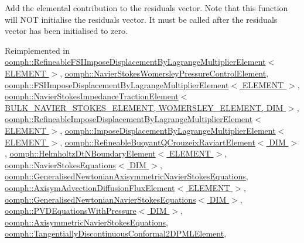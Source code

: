 Add the elemental contribution to the residuals vector. Note that this function will N\+OT initialise the residuals vector. It must be called after the residuals vector has been initialised to zero. 



Reimplemented in \hyperlink{classoomph_1_1RefineableFSIImposeDisplacementByLagrangeMultiplierElement_aa4b78afa54ddb638bfc9428b2b6fe860}{oomph\+::\+Refineable\+F\+S\+I\+Impose\+Displacement\+By\+Lagrange\+Multiplier\+Element$<$ E\+L\+E\+M\+E\+N\+T $>$}, \hyperlink{classoomph_1_1NavierStokesWomersleyPressureControlElement_a336e39637cd1405c5edefbcb4c9e26e8}{oomph\+::\+Navier\+Stokes\+Womersley\+Pressure\+Control\+Element}, \hyperlink{classoomph_1_1FSIImposeDisplacementByLagrangeMultiplierElement_aadea4a492cc464dae2c77617a706a98d}{oomph\+::\+F\+S\+I\+Impose\+Displacement\+By\+Lagrange\+Multiplier\+Element$<$ E\+L\+E\+M\+E\+N\+T $>$}, \hyperlink{classoomph_1_1NavierStokesImpedanceTractionElement_a59864479b537aae999dceaa38e8856ef}{oomph\+::\+Navier\+Stokes\+Impedance\+Traction\+Element$<$ B\+U\+L\+K\+\_\+\+N\+A\+V\+I\+E\+R\+\_\+\+S\+T\+O\+K\+E\+S\+\_\+\+E\+L\+E\+M\+E\+N\+T, W\+O\+M\+E\+R\+S\+L\+E\+Y\+\_\+\+E\+L\+E\+M\+E\+N\+T, D\+I\+M $>$}, \hyperlink{classoomph_1_1RefineableImposeDisplacementByLagrangeMultiplierElement_a31ed3e9bd0d168fb2278add70062dac2}{oomph\+::\+Refineable\+Impose\+Displacement\+By\+Lagrange\+Multiplier\+Element$<$ E\+L\+E\+M\+E\+N\+T $>$}, \hyperlink{classoomph_1_1ImposeDisplacementByLagrangeMultiplierElement_a1c65bc4013288cba24313e4cd1339919}{oomph\+::\+Impose\+Displacement\+By\+Lagrange\+Multiplier\+Element$<$ E\+L\+E\+M\+E\+N\+T $>$}, \hyperlink{classoomph_1_1RefineableBuoyantQCrouzeixRaviartElement_a102b3aeb79d9af430b9ce0a7c8d5bd33}{oomph\+::\+Refineable\+Buoyant\+Q\+Crouzeix\+Raviart\+Element$<$ D\+I\+M $>$}, \hyperlink{classoomph_1_1HelmholtzDtNBoundaryElement_a963011242bb33d0e5d8cbd46dd878f9e}{oomph\+::\+Helmholtz\+Dt\+N\+Boundary\+Element$<$ E\+L\+E\+M\+E\+N\+T $>$}, \hyperlink{classoomph_1_1NavierStokesEquations_a314875a11bafbf24d6a84df31e0213e8}{oomph\+::\+Navier\+Stokes\+Equations$<$ D\+I\+M $>$}, \hyperlink{classoomph_1_1GeneralisedNewtonianAxisymmetricNavierStokesEquations_a93e6106a94fe78998c9e9eb63d8825bc}{oomph\+::\+Generalised\+Newtonian\+Axisymmetric\+Navier\+Stokes\+Equations}, \hyperlink{classoomph_1_1AxisymAdvectionDiffusionFluxElement_a2264f12223ccbcc2f4e3f89403fddea4}{oomph\+::\+Axisym\+Advection\+Diffusion\+Flux\+Element$<$ E\+L\+E\+M\+E\+N\+T $>$}, \hyperlink{classoomph_1_1GeneralisedNewtonianNavierStokesEquations_a6caf76fe70722b03b4826aa4b1dd6612}{oomph\+::\+Generalised\+Newtonian\+Navier\+Stokes\+Equations$<$ D\+I\+M $>$}, \hyperlink{classoomph_1_1PVDEquationsWithPressure_a6e44d72eea0bbb65d43d01789fcf452c}{oomph\+::\+P\+V\+D\+Equations\+With\+Pressure$<$ D\+I\+M $>$}, \hyperlink{classoomph_1_1AxisymmetricNavierStokesEquations_a3b9eb44ce84a06cee51b9fac3fb75673}{oomph\+::\+Axisymmetric\+Navier\+Stokes\+Equations}, \hyperlink{classoomph_1_1TangentiallyDiscontinuousConformal2DPMLElement_a9f5ccd0826199bd3161c5d67c14344b3}{oomph\+::\+Tangentially\+Discontinuous\+Conformal2\+D\+P\+M\+L\+Element}, 